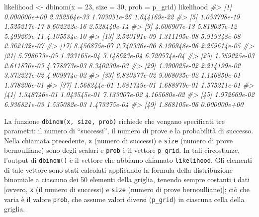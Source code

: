 \documentclass[
]{memoir}
\newenvironment{Shaded}{\begin{snugshade}}{\end{snugshade}}
\newcommand{\AttributeTok}[1]{\textcolor[rgb]{0.77,0.63,0.00}{#1}}
\newcommand{\CommentTok}[1]{\textcolor[rgb]{0.56,0.35,0.01}{\textit{#1}}}
\newcommand{\DecValTok}[1]{\textcolor[rgb]{0.00,0.00,0.81}{#1}}
\newcommand{\FunctionTok}[1]{\textcolor[rgb]{0.00,0.00,0.00}{#1}}
\newcommand{\NormalTok}[1]{#1}
\newcommand{\OtherTok}[1]{\textcolor[rgb]{0.56,0.35,0.01}{#1}}
\begin{document}
\begin{Shaded}
\begin{Highlighting}[]
\NormalTok{likelihood }\OtherTok{\textless{}{-}} \FunctionTok{dbinom}\NormalTok{(}\AttributeTok{x =} \DecValTok{23}\NormalTok{, }\AttributeTok{size =} \DecValTok{30}\NormalTok{, }\AttributeTok{prob =}\NormalTok{ p\_grid)}
\NormalTok{likelihood}
\CommentTok{\#\textgreater{}  [1] 0.000000e+00 2.352564e{-}33 1.703051e{-}26 1.644169e{-}22}
\CommentTok{\#\textgreater{}  [5] 1.053708e{-}19 1.525217e{-}17 8.602222e{-}16 2.528440e{-}14}
\CommentTok{\#\textgreater{}  [9] 4.606907e{-}13 5.819027e{-}12 5.499269e{-}11 4.105534e{-}10}
\CommentTok{\#\textgreater{} [13] 2.520191e{-}09 1.311195e{-}08 5.919348e{-}08 2.362132e{-}07}
\CommentTok{\#\textgreater{} [17] 8.456875e{-}07 2.749336e{-}06 8.196948e{-}06 2.259614e{-}05}
\CommentTok{\#\textgreater{} [21] 5.798673e{-}05 1.393165e{-}04 3.148623e{-}04 6.720574e{-}04}
\CommentTok{\#\textgreater{} [25] 1.359225e{-}03 2.611870e{-}03 4.778973e{-}03 8.340230e{-}03}
\CommentTok{\#\textgreater{} [29] 1.390025e{-}02 2.214199e{-}02 3.372227e{-}02 4.909974e{-}02}
\CommentTok{\#\textgreater{} [33] 6.830377e{-}02 9.068035e{-}02 1.146850e{-}01 1.378206e{-}01}
\CommentTok{\#\textgreater{} [37] 1.568244e{-}01 1.681749e{-}01 1.688979e{-}01 1.575211e{-}01}
\CommentTok{\#\textgreater{} [41] 1.348746e{-}01 1.043545e{-}01 7.133007e{-}02 4.165680e{-}02}
\CommentTok{\#\textgreater{} [45] 1.972669e{-}02 6.936821e{-}03 1.535082e{-}03 1.473375e{-}04}
\CommentTok{\#\textgreater{} [49] 1.868105e{-}06 0.000000e+00}
\end{Highlighting}
\end{Shaded}

\noindent
La funzione \texttt{dbinom(x,\ size,\ prob)} richiede che vengano specificati tre parametri: il numero di ``successi'', il numero di prove e la probabilità di successo. Nella chiamata precedente, \texttt{x} (numero di successi) e \texttt{size} (numero di prove bernoulliane) sono degli scalari e \texttt{prob} è il vettore \texttt{p\_grid}. In tali circostanze, l'output di \texttt{dbinom()} è il vettore che abbiamo chiamato \texttt{likelihood}. Gli elementi di tale vettore sono stati calcolati applicando la formula della distribuzione binomiale a ciascuno dei 50 elementi della griglia, tenendo sempre costanti i dati {[}ovvero, \texttt{x} (il numero di successi) e \texttt{size} (numero di prove bernoulliane){]}; ciò che varia è il valore \texttt{prob}, che assume valori diversi (\texttt{p\_grid}) in ciascuna cella della griglia.
\end{document}
